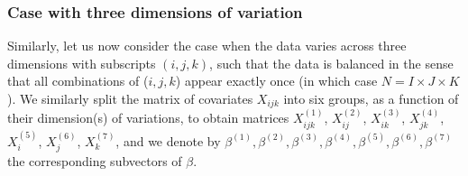 \documentclass[12pt]{article}
\begin{document}
\subsubsection{Case with three dimensions of variation}
Similarly, let us now consider the case when the data varies across three dimensions with subscripts $(i,j,k)$, such that the data is balanced in the sense that all combinations of ($i,j,k$) appear exactly once (in which case $N = I \times J \times K$). We similarly split the matrix of covariates $X_{ijk}$ into six groups, as a function of their dimension(s) of variations, to obtain matrices $X^{(1)}_{ijk}$, $X^{(2)}_{ij}$, $X^{(3)}_{ik}$, $X^{(4)}_{jk}$, $X^{(5)}_{i}$, $X^{(6)}_{j}$, $X^{(7)}_{k}$, and we denote by $\beta^{(1)}, \beta^{(2)}, \beta^{(3)}, \beta^{(4)}, \beta^{(5)}, \beta^{(6)}, \beta^{(7)}$ the corresponding subvectors of $\beta$.
\end{document}
